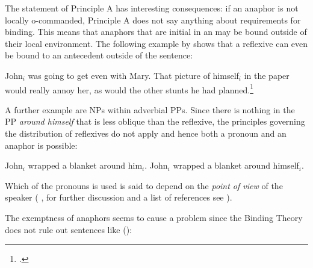 \documentclass[output=paper
 	        ,biblatex
                ,babelshorthands
                ,newtxmath
                ,draftmode
                ,colorlinks, citecolor=brown
]{langscibook}
\begin{document}

The statement of Principle A has interesting consequences: if an anaphor is not locally o-commanded,
Principle A does not say anything about requirements for binding. This means that anaphors that are
initial in an \argstl may be bound outside of their local environment. The following example by
\citet[]{ps2} shows that a reflexive can even be bound to an antecedent outside of the sentence:

\eanoraggedright
John$_i$ was going to get even with Mary. That picture of himself$_i$
in the paper would really annoy her, as would the other stunts he had planned.\footnote{
        .
}
\z

\noindent
A further example are NPs within adverbial PPs. Since there is nothing in the PP \emph{around
  himself} that is less oblique than the reflexive, the principles governing the distribution of
reflexives do not apply and hence both a pronoun and an anaphor is possible:

\eal
\label{ex-john-wrapped-a-blanket-around-him}
\ex John$_i$ wrapped a blanket around him$_i$.
\ex John$_i$ wrapped a blanket around himself$_i$.
\zl
{}

\noindent
Which of the pronouns is used is said to depend on the \emph{point of view} of the speaker
(%
\citealp{Kuroda1973a-u}, for further discussion and a list of references see \citealp[]{ps2}).


The exemptness of anaphors seems to cause a problem since the Binding Theory does not rule out sentences like ():
\z
{}
\end{document}

